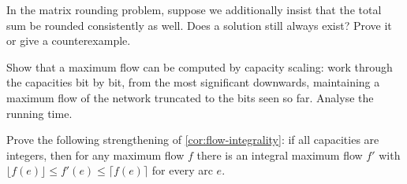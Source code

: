 \begin{exercise}
In the matrix rounding problem, suppose we additionally insist that the total
sum be rounded consistently as well. Does a solution still always exist? Prove
it or give a counterexample.
\end{exercise}

\begin{exercise}
Show that a maximum flow can be computed by capacity scaling: work through the
capacities bit by bit, from the most significant downwards, maintaining a
maximum flow of the network truncated to the bits seen so far. Analyse the
running time.
\end{exercise}

\begin{exercise}
Prove the following strengthening of \cref{cor:flow-integrality}: if all
capacities are integers, then for any maximum flow $f$ there is an integral
maximum flow $f'$ with $\lfloor f(e) \rfloor \le f'(e) \le \lceil f(e) \rceil$
for every arc $e$.
\end{exercise}

